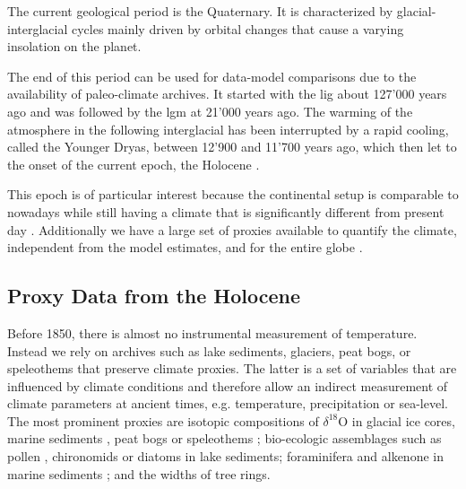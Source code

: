 \begin{refsection}
The current geological period is the Quaternary. It is characterized by glacial-interglacial cycles mainly driven by orbital changes \citep{HaysImbrieShackleton1976, ImbrieBergerBoyleEtAl1993} that cause a varying insolation on the planet.

The end of this period can be used for data-model comparisons due to the availability of paleo-climate archives. It started with the \gls{lig} about 127'000 years ago and was followed by the \gls{lgm} at 21'000 years ago. The warming of the atmosphere in the following interglacial  has been interrupted by a rapid cooling, called the Younger Dryas, between 12'900 and 11'700 years ago, which then let to the onset of the current epoch, the Holocene \citep{WalkerJohnsenRasmussenEtAl2009} .


This epoch is of particular interest because the continental setup is comparable to nowadays while still having a climate that is significantly different from present day . Additionally we have a large set of proxies available to quantify the climate, independent from the model estimates, and for the entire globe \citep{WannerBeerButikoferEtAl2008} .


\subsection{Proxy Data from the Holocene}  \label{sec:intro-paleo-data}
Before 1850, there is almost no instrumental measurement of temperature. Instead we rely on archives such as lake sediments, glaciers, peat bogs, or speleothems that preserve climate proxies. The latter is a set of variables that are influenced by climate conditions and therefore allow an indirect measurement of climate parameters at ancient times, e.g. temperature, precipitation or sea-level. The most prominent proxies are isotopic compositions of $\delta^{18}$O in glacial ice cores\addref, marine sediments \addref, peat bogs \addref or speleothems \addref; bio-ecologic assemblages such as pollen \addref, chironomids \addref or diatoms \addref in lake sediments; foraminifera and alkenone in marine sediments \addref; and the widths of tree rings.


\end{refsection}
